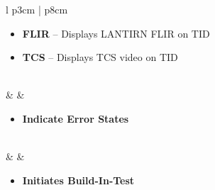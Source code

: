 \documentclass[8pt,usenames,dvipsnames,twoside]{article}
\begin{document}
\begin{center}
\begin{tabular}{l p{3cm} | p{8cm}}
				\begin{minipage}[t]{\linewidth}
					\vspace{-7pt}
					\begin{itemize}
						\item \textbf{FLIR} -- Displays LANTIRN FLIR on TID
						\item \textbf{TCS} -- Displays TCS video on TID
					\end{itemize}
				\end{minipage} \\
				\midrule
				\textbullet &  &
				\begin{minipage}[t]{\linewidth}
					\vspace{-7pt}
					\begin{itemize}
						\item \textbf{Indicate Error States}
					\end{itemize}
				\end{minipage} \\
				\midrule
				\textbullet &  &
				\begin{minipage}[t]{\linewidth}
					\vspace{-7pt}
					\begin{itemize}
						\item \textbf{Initiates Build-In-Test}
					\end{itemize}
				\end{minipage} \\
				\bottomrule
			\end{tabular}
		\end{center}
	
		\hypertarget{subsec:lantirncontrolsstick}{}
\end{document}
